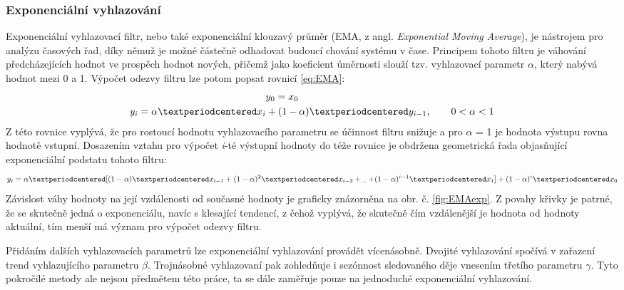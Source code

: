 \documentclass[a4paper, 12pt]{article}
\begin{document}
\subsubsection{Exponenciální vyhlazování}
\label{sec:filtr4}
Exponenciální vyhlazovací filtr, nebo také exponenciální klouzavý průměr (EMA, z angl. \textit{Exponential Moving Average}), je nástrojem pro analýzu časových řad, díky němuž je možné částečně odhadovat budoucí chování systému v čase. Principem tohoto filtru je váhování předcházejících hodnot ve prospěch hodnot nových, přičemž jako koeficient úměrnosti slouží tzv. vyhlazovací parametr $\alpha$, který nabývá hodnot mezi 0 a 1. Výpočet odezvy filtru lze potom popsat rovnicí \ref{eq:EMA}:
\begin{equation} \label{eq:EMA}
\begin{gathered}
    y_{0} = x_{0}\hspace{6em} \\
    y_{i} = \alpha·x_{i}+(1-\alpha)·y_{i-1},\qquad 0<\alpha<1
\end{gathered}
\vspace{0.25cm}
\end{equation}
Z této rovnice vyplývá, že pro rostoucí hodnotu vyhlazovacího parametru se účinnost filtru snižuje a pro $\alpha$ = 1 je hodnota výstupu rovna hodnotě vstupní. Dosazením vztahu pro výpočet \textit{i}-té výstupní hodnoty do téže rovnice je obdržena geometrická řada objasňující exponenciální podstatu tohoto filtru:
\begin{equation} \label{eq:EMAexp}
    y_{i} = \alpha·[(1-\alpha)·x_{i-1}+(1-\alpha)^{2}·x_{i-2}+_{\ldots}+(1-\alpha)^{i-1}·x_{1}]+(1-\alpha)^{i}·x_{0}
\vspace{0.25cm}
\end{equation}
Závislost váhy hodnoty na její vzdálenosti od současné hodnoty je graficky znázorněna na obr. č. \ref{fig:EMAexp}. Z povahy křivky je patrné, že se skutečně jedná o exponenciálu, navíc s klesající tendencí, z čehož vyplývá, že skutečně čím vzdálenější je hodnota od hodnoty aktuální, tím menší má význam pro výpočet odezvy filtru.

Přidáním dalších vyhlazovacích parametrů lze exponenciální vyhlazování provádět vícenásobně. Dvojité vyhlazování spočívá v zařazení trend vyhlazujícího parametru $\beta$. Trojnásobné vyhlazovaní pak zohledňuje i sezónnost sledovaného děje vnesením třetího parametru $\gamma$. Tyto pokročilé metody ale nejsou předmětem této práce, ta se dále zaměřuje pouze na jednoduché exponenciální vyhlazování.
\end{document}
